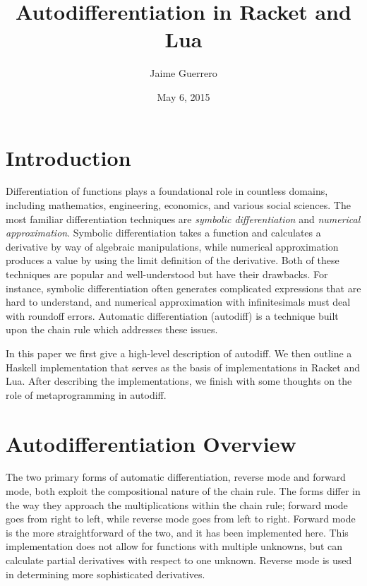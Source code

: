 \documentclass[font=9pt]{article}
\author{Jaime Guerrero}
\date{May 6, 2015}
\title{Autodifferentiation in Racket and Lua}
\begin{document}
\maketitle

\section{Introduction}
Differentiation of functions plays a foundational role in countless domains,
including mathematics, engineering, economics, and various social sciences.  The
most familiar differentiation techniques are \textit{symbolic differentiation}
and \textit{numerical approximation}.  Symbolic differentiation takes a function
and calculates a derivative by way of algebraic manipulations, while numerical
approximation produces a value by using the limit definition of the derivative.
Both of these techniques are popular and well-understood but have their
drawbacks.  For instance, symbolic differentiation often generates complicated
expressions that are hard to understand, and numerical approximation with
infinitesimals must deal with roundoff errors.  Automatic differentiation
(autodiff) is a technique built upon the chain rule which addresses these
issues.

In this paper we first give a high-level description of autodiff.  We then
outline a Haskell implementation that serves as the basis of implementations in
Racket and Lua.  After describing the implementations, we finish with some
thoughts on the role of metaprogramming in autodiff.


\section{Autodifferentiation Overview}
The two primary forms of automatic differentiation, reverse mode and forward
mode, both exploit the compositional nature of the chain rule.  The forms differ
in the way they approach the multiplications within the chain rule; forward mode
goes from right to left, while reverse mode goes from left to right.  Forward
mode is the more straightforward of the two, and it has been implemented here.
This implementation does not allow for functions with multiple unknowns, but can
calculate partial derivatives with respect to one unknown.  Reverse mode is used
in determining more sophisticated derivatives.
\end{document}
